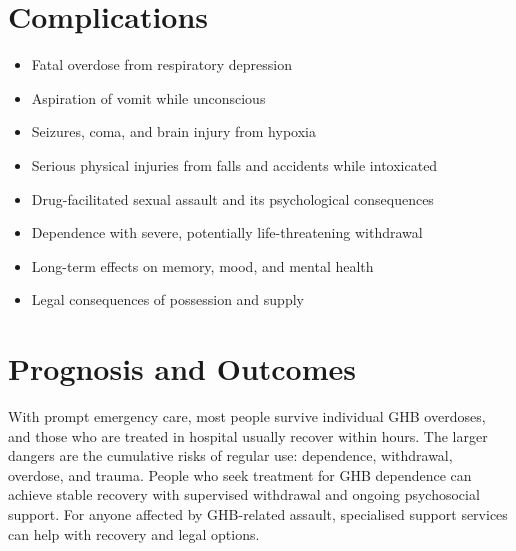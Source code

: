 \section*{Complications}
\begin{itemize}
    \item Fatal overdose from respiratory depression
    \item Aspiration of vomit while unconscious
    \item Seizures, coma, and brain injury from hypoxia
    \item Serious physical injuries from falls and accidents while intoxicated
    \item Drug-facilitated sexual assault and its psychological consequences
    \item Dependence with severe, potentially life-threatening withdrawal
    \item Long-term effects on memory, mood, and mental health
    \item Legal consequences of possession and supply
\end{itemize}

\section*{Prognosis and Outcomes}
With prompt emergency care, most people survive individual GHB overdoses, and those who are treated in hospital usually recover within hours. The larger dangers are the cumulative risks of regular use: dependence, withdrawal, overdose, and trauma. People who seek treatment for GHB dependence can achieve stable recovery with supervised withdrawal and ongoing psychosocial support. For anyone affected by GHB-related assault, specialised support services can help with recovery and legal options.

